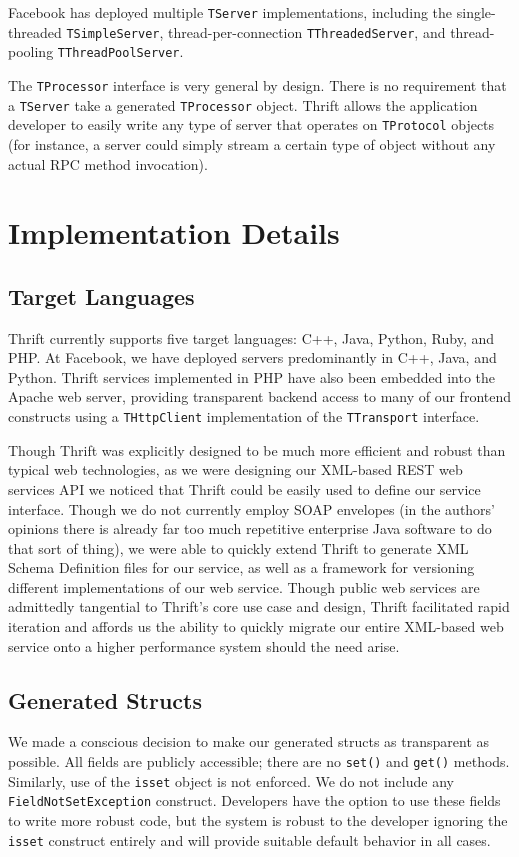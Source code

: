 \documentclass[nocopyrightspace,blockstyle]{sigplanconf}
\begin{document}
Facebook has deployed multiple \texttt{TServer} implementations, including
the single-threaded \texttt{TSimpleServer}, thread-per-connection
\texttt{TThreadedServer}, and thread-pooling \texttt{TThreadPoolServer}.

The \texttt{TProcessor} interface is very general by design. There is no
requirement that a \texttt{TServer} take a generated \texttt{TProcessor}
object. Thrift allows the application developer to easily write any type of
server that operates on \texttt{TProtocol} objects (for instance, a server
could simply stream a certain type of object without any actual RPC method
invocation).

\section{Implementation Details}
\subsection{Target Languages}
Thrift currently supports five target languages: C++, Java, Python, Ruby, and
PHP. At Facebook, we have deployed servers predominantly in C++, Java, and
Python. Thrift services implemented in PHP have also been embedded into the
Apache web server, providing transparent backend access to many of our
frontend constructs using a \texttt{THttpClient} implementation of the
\texttt{TTransport} interface.

Though Thrift was explicitly designed to be much more efficient and robust
than typical web technologies, as we were designing our XML-based REST web
services API we noticed that Thrift could be easily used to define our
service interface. Though we do not currently employ SOAP envelopes (in the
authors' opinions there is already far too much repetitive enterprise Java
software to do that sort of thing), we were able to quickly extend Thrift to
generate XML Schema Definition files for our service, as well as a framework
for versioning different implementations of our web service. Though public
web services are admittedly tangential to Thrift's core use case and design,
Thrift facilitated rapid iteration and affords us the ability to quickly
migrate our entire XML-based web service onto a higher performance system
should the need arise.

\subsection{Generated Structs}
We made a conscious decision to make our generated structs as transparent as
possible. All fields are publicly accessible; there are no \texttt{set()} and
\texttt{get()} methods. Similarly, use of the \texttt{isset} object is not
enforced. We do not include any \texttt{FieldNotSetException} construct.
Developers have the option to use these fields to write more robust code, but
the system is robust to the developer ignoring the \texttt{isset} construct
entirely and will provide suitable default behavior in all cases.
\end{document}
